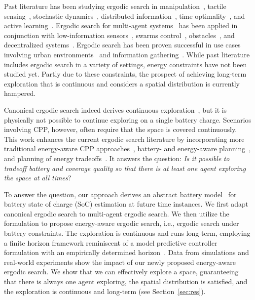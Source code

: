 \documentclass[lettersize,journal,twoside]{IEEEtran}
\theoremstyle{definition}
\begin{document}
Past literature has been studying ergodic search in manipulation~\cite{shetty2022ergodic}, tactile sensing~\cite{abraham2017ergodic}, stochastic dynamics~\cite{ayvali2017ergodic,torre2016ergodic}, distributed information~\cite{miller2016ergodic}, time optimality~\cite{dong2023time}, and active learning~\cite{abraham2021ergodic}. Ergodic search for multi-agent systems~\cite{prabhakar2020ergodic,coffin2022multi} has been applied in conjunction with low-information sensors~\cite{coffin2022multi,lerch2023safety,abraham2018decentralized}, swarms control~\cite{prabhakar2020ergodic}, obstacles~\cite{lerch2023safety}, and decentralized systems~\cite{abraham2018decentralized}. Ergodic search has been proven successful in use cases involving urban environments~\cite{patel2021multi} and information gathering~\cite{dressel2018optimality}.
While past literature includes ergodic search in a variety of settings, energy constraints have not been studied yet. Partly due to these constraints, the prospect of achieving long-term exploration that is continuous and considers a spatial distribution is currently hampered. 

Canonical ergodic search indeed derives continuous exploration~\cite{%
miller2013trajectory,miller2016ergodic,abraham2017ergodic}, but it is physically not possible to continue exploring on a single battery charge. 
Scenarios involving CPP, however, often require that the space is covered continuously.
This work enhances the current ergodic search literature by incorporating more traditional energy-aware CPP approaches~\cite{difranco2015energy,difranco2016coverage,shnaps2016online,cabreira2018energy,wei2018coverage,jensen2021near}, battery- and energy-aware planning~\cite{mei2004energy,mei2005case,kim2005energy,seewald2022energy}, and planning of energy tradeoffs~\cite{ondruska2015scheduled,sudhakar2020balancing}. It answers the question: \textit{Is it possible to tradeoff battery and coverage quality so that there is at least one agent exploring the space at all times}?

To answer the question, our approach derives an abstract battery model~\cite{zhao2017observability} for battery state of charge (SoC) estimation at future time instances. We first adapt canonical ergodic search to multi-agent ergodic search. We then utilize the formulation to propose energy-aware ergodic search, i.e., ergodic search under battery constraints. The exploration is continuous and runs long-term, employing a finite horizon framework reminiscent of a model predictive controller formulation with an empirically determined horizon~\cite{seewald2022energy}. Data from simulations and real-world experiments show the impact of our newly proposed energy-aware ergodic search. We show that we can effectively explore a space, guaranteeing that there is always one agent exploring, the spatial distribution is satisfied, and the exploration is continuous and long-term (see Section~\ref{sec:res}).
\end{document}
